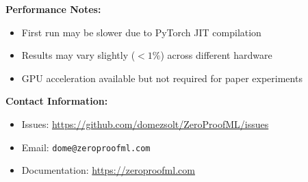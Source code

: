 \documentclass[twoside,11pt]{article}
\begin{document}
\textbf{Performance Notes:}
\begin{itemize}
\item First run may be slower due to PyTorch JIT compilation
\item Results may vary slightly ($< 1\%$) across different hardware
\item GPU acceleration available but not required for paper experiments
\end{itemize}

\textbf{Contact Information:}
\begin{itemize}
\item Issues: \url{https://github.com/domezsolt/ZeroProofML/issues}
\item Email: \texttt{dome@zeroproofml.com}
\item Documentation: \url{https://zeroproofml.com}
\end{itemize}
\end{document}
